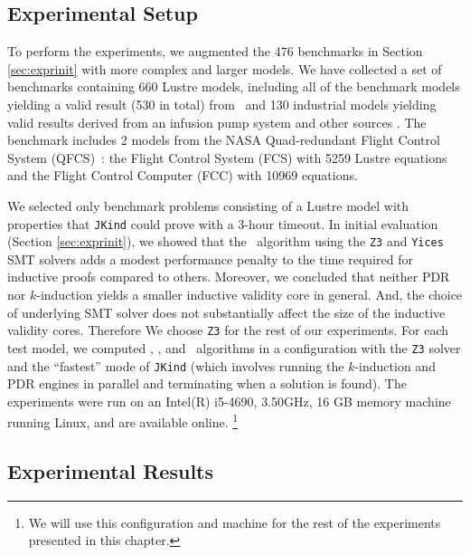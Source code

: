 \subsection{Experimental Setup}
\label{sec:expsetup}
To perform the experiments, we augmented the 476 benchmarks in Section \ref{sec:exprinit} with more complex and larger models. We have collected a set of benchmarks containing 660 Lustre models, including all of the benchmark models yielding a valid result (530 in total) from~\cite{Hagen08:FMCAD, piskac2016} and 130 industrial models yielding valid results derived from an infusion pump system \cite{hilt2013} and other sources \cite{piskac2016, NFM2015:backes}.
The benchmark includes 2 models from the NASA Quad-redundant Flight Control System (QFCS)~\cite{NFM2015:backes}: the Flight Control System (FCS) with 5259 Lustre equations and the Flight Control Computer (FCC) with 10969 equations.

We selected only benchmark problems consisting of a Lustre model with
properties that \texttt{JKind} could prove with a 3-hour timeout.
In initial evaluation (Section \ref{sec:exprinit}), we showed that the \ucalg\ algorithm using the \texttt{Z3} and \texttt{Yices} SMT solvers adds
a modest performance penalty to the time required for inductive
proofs compared to others.
Moreover, we concluded that neither PDR nor $k$-induction yields a smaller inductive
validity core in general. And, the choice of underlying SMT solver does
not substantially affect the size of the inductive validity cores. Therefore We choose \texttt{Z3} for the rest of our experiments.
For each test model, we computed \aivcalg, \ucalg, and \ucbfalg ~algorithms in a configuration with the \texttt{Z3} solver and the ``fastest'' mode of \texttt{JKind} (which involves running the $k$-induction and PDR engines in parallel and terminating when a solution is found). The experiments were run on an  Intel(R) i5-4690, 3.50GHz, 16 GB memory machine running Linux, and are available online\cite{expr}. \footnote{We will use this configuration and machine for the rest of the experiments presented in this chapter.}


\subsection{Experimental Results}
\label{subsec:res}
 